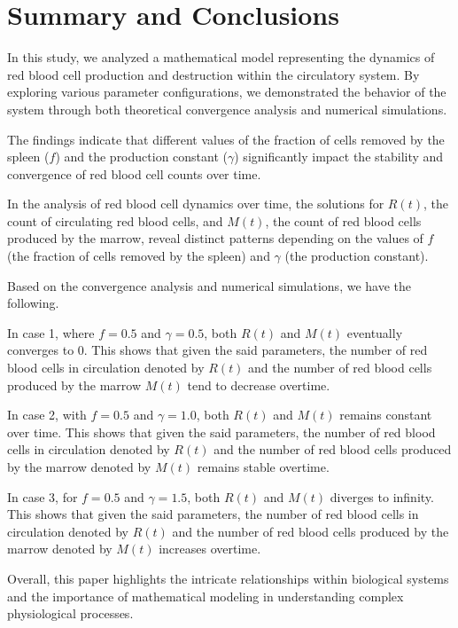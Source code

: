 \documentclass [a4paper]{article}
\begin{document}
\section{Summary and Conclusions}
In this study, we analyzed a mathematical model representing the dynamics of red blood cell production and destruction within the circulatory system. By exploring various parameter configurations, we demonstrated the behavior of the system through both theoretical convergence analysis and numerical simulations.

The findings indicate that different values of the fraction of cells removed by the spleen (\(f\)) and the production constant (\(\gamma\)) significantly impact the stability and convergence of red blood cell counts over time. 

In the analysis of red blood cell dynamics over time, the solutions for \( R(t) \), the count of circulating red blood cells, and \( M(t) \), the count of red blood cells produced by the marrow, reveal distinct patterns depending on the values of \( f \) (the fraction of cells removed by the spleen) and \( \gamma \) (the production constant). 

Based on the convergence analysis and numerical simulations, we have the following. 

In case 1, where \( f = 0.5 \) and \( \gamma = 0.5 \), both \( R(t) \) and \( M(t) \) eventually converges to 0. This shows that given the said parameters, the number of red blood cells in circulation denoted by \(R(t)\) and the number of red blood cells produced by the marrow \(M(t)\) tend to decrease overtime. 

In case 2, with \( f = 0.5 \) and \( \gamma = 1.0 \), both \( R(t) \) and \( M(t) \) remains constant over time. This shows that given the said parameters, the number of red blood cells in circulation denoted by \(R(t)\) and the number of red blood cells produced by the marrow denoted by \(M(t)\) remains stable overtime. 

In case 3, for \( f = 0.5 \) and \( \gamma = 1.5 \), both \( R(t) \) and \( M(t) \) diverges to infinity.  This shows that given the said parameters, the number of red blood cells in circulation denoted by \(R(t)\) and the number of red blood cells produced by the marrow denoted by \(M(t)\) increases overtime. 

Overall, this paper highlights the intricate relationships within biological systems and the importance of mathematical modeling in understanding complex physiological processes.


 
\end{document}
